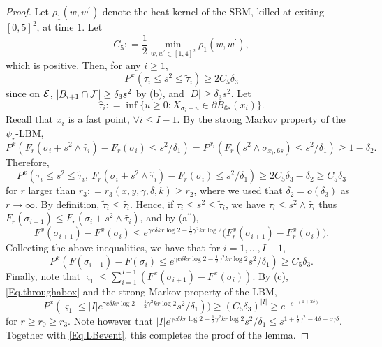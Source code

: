 \documentclass[11pt]{article}
\theoremstyle{definition}
\def \cB {{B}}
\def \d {\delta}
\def \ff {{\cal F}}
\def \s {\sigma}
\def \ee {{\cal E}}
\begin{document}
\begin{proof}
Let $\rho_1 (w, w^\prime)$ denote
the heat kernel of  the SBM, killed at exiting
$[0,5]^2$, at time $1$.
Let
 \begin{equation} \label{Eq.defC5}
C_5 : = \frac 1 2 \min_{w, w^\prime \in [1,4]^2} \rho_1 (w, w^\prime) ,
 \end{equation}
which is positive. Then, for any $i \ge 1$,
 $$
P^x (\tau_i \le s^2 \le \tilde \tau_i ) \ge 2 C_5 \d_3
 $$
since on $\ee$, $| \cB_{i+1} \cap \ff | \ge \d_3 s^2$ by (b), and $|D| \ge \d_3 s^2$. Let
 $$
\hat \tau_i : = \inf \{ u \ge 0 : X_{\s_i + u}
\in \partial B_{6 s} (x_i) \} .
 $$
Recall
that $x_i$ is a fast point, $\forall i \le I-1$.  By the
strong Markov property of the $\psi_r$-LBM,
 $$
P^x (F_r (\s_i + s^2 \wedge \hat \tau_i) - F_r (\s_i) \le s^2 / \d_1) = P^{x_i} (F_r (s^2 \wedge \s_{x_i, 6 s}) \le s^2 / \d_1 ) \ge 1 - \d_2 .
 $$
Therefore,
 $$
P^x (\tau_i \le s^2 \le \tilde \tau_i , \ F_r (\s_i + s^2 \wedge \hat \tau_i) - F_r (\s_i) \le s^2 / \d_1) \ge 2 C_5 \d_3 - \d_2 \ge C_5 \d_3
 $$
for $r$ larger than $r_3 : = r_3 (x,y, \gamma, \d , k) \ge r_2$, where we used that
$\d_2 = o (\d_3)$ as $r \to \infty$.
By definition, $\tilde \tau_i \le \hat \tau_i$.
Hence, if $\tau_i \le s^2 \le \tilde \tau_i$,
we have $\tau_i \le s^2 \wedge \hat \tau_i$ thus
$F_r (\s_{i+1}) \le F_r (\s_i + s^2 \wedge \hat \tau_i) $, and by (a$^{\prime\prime}$),
 $$
F^x (\s_{i+1}) - F^x (\s_i) \le e^{\gamma c \d k r \log 2 - \frac 1 2 \gamma^2 k r \log 2}  \big( F^x_r (\s_{i+1}) - F^x_r (\s_i) \big).
 $$
Collecting the above inequalities, we have that for $i=1,\ldots,I-1$,
 \begin{equation} \label{Eq.throughabox}
P^x (F (\s_{i+1}) - F (\s_i) \le e^{\gamma c \d k r \log 2 - \frac 1 2 \gamma^2 k r \log 2} s^2 / \d_1)  \ge  C_5 \d_3 .
 \end{equation}
Finally, note that $\varsigma_1 \le \sum_{i=1}^{I-1} ( F^x (\s_{i+1}) - F^x (\s_i ) )$. By (c), \eqref{Eq.throughabox} and the strong Markov property of the LBM,
 \begin{equation} \label{Eq.LBevent}
P^x ( \varsigma_1 \le |I| e^{\gamma c \d k r \log 2 - \frac 1 2 \gamma^2 k r \log 2} s^2 / \d_1) )  \ge  (C_5 \d_3)^{|I|}  \ge e^{- s^{ -(1+ 2 \d) }}
 \end{equation}
for $r \ge r_0 \ge r_3$. Note however
that
$ |I| e^{\gamma c \d k r \log 2 - \frac 1 2 \gamma^2 k r \log 2}
s^2 / \d_1 \le s^{1 + \frac 1 2 \gamma^2 - 4 \d - c \gamma \d }$. Together with
\eqref{Eq.LBevent},
this completes the proof of the lemma.
 \end{proof}
\end{document}

